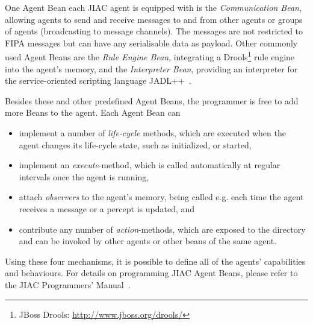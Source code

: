 One Agent Bean each JIAC agent is equipped with is the \emph{Communication Bean},
allowing agents to send and receive messages to and from other agents or groups
of agents (broadcasting to message channels).  The messages are not restricted to
FIPA messages but can have any serialisable data as payload.  Other commonly used
Agent Beans are the \emph{Rule Engine Bean}, integrating a Drools\footnote{JBoss
Drools: \url{http://www.jboss.org/drools/}} rule engine into the agent's memory,
and the \emph{Interpreter Bean}, providing an interpreter for the service-oriented
scripting language JADL++~\cite{hirsch2010programming}.

Besides these and other predefined Agent Beans, the programmer is free to add
more Beans to the agent.  Each Agent Bean can

\begin{itemize}
	\item implement a number of \emph{life-cycle} methods, which are executed when
	the agent changes its life-cycle state, such as initialized, or started,
	
	\item implement an \emph{execute}-method, which is called automatically at
	regular intervals once the agent is running,
	
	\item attach \emph{observers} to the agent's memory, being called e.g. each
	time the agent receives a message or a percept is updated, and
	
	\item contribute any number of \emph{action}-methods, which are exposed to the
	directory and can be invoked by other agents or other beans of the same agent.
\end{itemize}

Using these four mechanisms, it is possible to define all of the agents' capabilities
and behaviours.  For details on programming JIAC Agent Beans, please refer to the
JIAC Programmers' Manual~\cite{jiacManual}.

